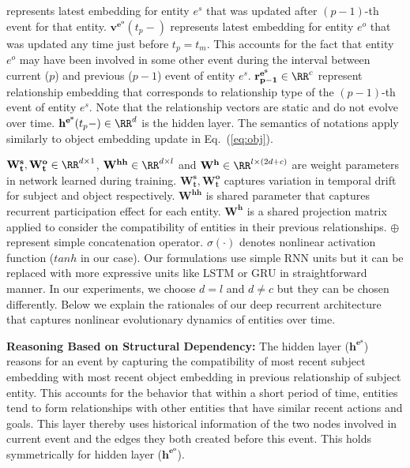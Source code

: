 \documentclass{article}
\begin{document}
represents latest embedding for entity $e^s$ that was updated after $(p-1)$-th event for that entity. $\mathbf{v^{e^o}}(t_p-)$ represents latest embedding for entity $e^o$ that was updated any time just before $t_p = t_m$. This accounts for the fact that entity $e^o$ may have been involved in some other event during the interval between current ($p$) and previous ($p-1$) event of entity $e^s$. $\mathbf{r^{e^s}_{p-1}} \in \RR^{c}$ represent relationship embedding that corresponds to relationship type of the $(p-1)$-th event of entity $e^s$. Note that the relationship vectors are static and do not evolve over time. $\mathbf{h^{e^s}}(t_{p}-) \in \RR^{d}$  is the hidden layer. The semantics of notations apply similarly to object embedding update in Eq.~(\ref{eq:obj}).

$\mathbf{W_t^{s}}, \mathbf{W_t^{o}} \in \RR^{d \times 1}$, $\mathbf{W^{hh}} \in \RR^{d \times l}$ and $\mathbf{W^h} \in \RR^{l \times (2d + c)}$ are weight parameters in network learned during training. $\mathbf{W_t^{s}}, \mathbf{W_t^{o}}$ captures variation in temporal drift for subject and object respectively. $\mathbf{W^{hh}} $ is shared parameter that captures recurrent participation effect for each entity. $\mathbf{W^h}$ is a shared projection matrix applied to consider the compatibility of entities in their previous relationships. $\oplus$ represent simple concatenation operator. $\sigma(\cdot)$ denotes nonlinear activation function ($tanh$ in our case). Our formulations use simple RNN units but it can be replaced with more expressive units like LSTM or GRU in straightforward manner. In our experiments, we choose $d = l$ and $d \neq c$ but they can be chosen differently.
Below we explain the rationales of our deep recurrent architecture that captures nonlinear evolutionary dynamics of entities over time.

{\bf Reasoning Based on Structural Dependency:} The hidden layer ($\mathbf{h^{e^s}}$) reasons for an event by capturing the compatibility of most recent subject embedding with most recent object embedding in previous relationship of subject entity. This accounts for the behavior that within a short period of time, entities tend to form relationships with other entities that have similar recent actions and goals. This layer thereby uses historical information of the two nodes involved in current event and the edges they both created before this event. This holds symmetrically for hidden layer ($\mathbf{h^{e^o}}$).
\end{document}
